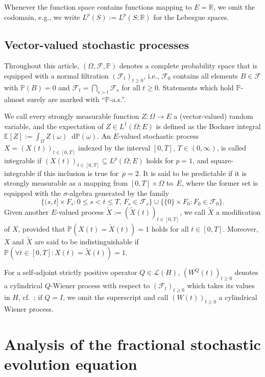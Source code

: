 \documentclass[reqno]{amsart}
\numberwithin{equation}{section}
\newcommand{\bbP}{\mathbb{P}}
\newcommand{\R}{\mathbb{R}}
\newcommand{\E}{\mathbb{E}}
\newcommand{\cF}{\mathcal{F}}
\newcommand{\rd}{\mathop{}\!\mathrm{d}}
\newcommand{\from}{\colon}
\theoremstyle{remark}
\theoremstyle{definition}
\begin{document}
Whenever the function space contains 
functions mapping to $E=\R$, 
we omit the codomain, 
e.g., we write $L^p(S) := L^p(S;\R)$ 
for the Lebesgue spaces. 


\subsection{Vector-valued stochastic processes} 

Throughout this article, 
$(\Omega,\cF,\bbP)$ denotes 
a complete probability space 
that is equipped 
with a normal filtration $(\cF_t)_{t\geq 0}$, i.e., 
$\cF_0$ contains all elements $B\in\cF$ with 
$\bbP(B)=0$ and  
$\cF_t = \bigcap_{s>t} \cF_s$ for all $t\geq 0$. 
%
Statements which 
hold $\bbP$-almost surely 
are marked with ``$\bbP$-a.s.''\!.  

We call every strongly measurable function 
$Z\from \Omega \to E$ 
a (vector-valued) random variable, 
%
and the expectation of $Z \in L^1(\Omega;E)$ 
is defined as the Bochner integral
$\E[Z] := \int_{\Omega} Z(\omega) \rd \bbP(\omega)$. 
% 
An $E$-valued stochastic process 
$X=(X(t))_{t\in[0,T]}$ 
indexed by the interval $[0,T]$, 
$T\in(0,\infty)$, 
is called integrable if 
${(X(t))_{t\in[0,T]} \subseteq L^p(\Omega;E)}$ 
holds for $p=1$,  
and square-integrable 
if this inclusion is true for~$p=2$. 
%
It is said to be predictable 
if it is strongly measurable 
as a mapping from $[0,T]\times \Omega$ to~$E$, 
where the former set is equipped 
with the $\sigma$-algebra generated by the family
%
\[
\{ (s,t] \times F_s: 0\leq s < t\leq T,\, F_s\in \cF_s \} 
\cup 
\{ \{0\}\times F_0 : F_0\in \cF_0 \}.
\] 
%
Given another 
$E$-valued
process $\widetilde X := (\widetilde X(t))_{t\in[0,T]}$,
we call $\widetilde X$ a modification
of $X$, provided that  
$\bbP(X(t)=\widetilde X(t))=1$ 
holds for all $t\in[0,T]$. 
Moreover, $X$ and $\widetilde X$
are said to be indistinguishable if 
$\bbP(\forall t\in[0,T] : X(t) = \widetilde X(t))=1$. 

For a self-adjoint strictly positive 
operator $Q \in \mathscr L(H)$, 
$(W^Q(t))_{t\geq 0}$ denotes 
a cylindrical $Q$-Wiener process
with respect to $(\cF_t)_{t\geq 0}$ which takes
its values in $H$, cf.~\cite[Proposition~2.5.2]{LiuRockner2015};
if $Q=I$, we omit the superscript 
and call $(W(t))_{t\geq 0}$ a cylindrical Wiener process. 


\section{Analysis of the fractional stochastic evolution equation}
\label{sec:analysis-zeroIC}
\end{document}
